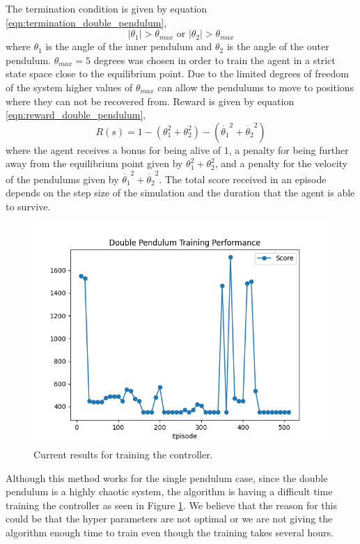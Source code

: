 \documentclass{LTHtwocol} %
\begin{document}
The termination condition is given by equation \eqref{eqn:termination_double_pendulum},
\begin{equation}
	|\theta_1| > \theta_{max} \text{ or } |\theta_2| > \theta_{max}
	\label{eqn:termination_double_pendulum}
\end{equation}
where $\theta_1$ is the angle of the inner pendulum and $\theta_2$ is the angle of the outer pendulum.
$\theta_{max} = 5$ degrees was chosen in order to train the agent in a strict state space close to the equilibrium point.
Due to the limited degrees of freedom of the system higher values of $\theta_{max}$ can allow the pendulums to move to positions where they can not be recovered from.
Reward is given by equation \eqref{eqn:reward_double_pendulum},
\begin{equation}
	R(s) = 1 - \left( \theta_1^2 + \theta_2^2 \right) - \left(\dot{\theta_1}^2 + \dot{\theta_2}^2 \right)
	\label{eqn:reward_double_pendulum}
\end{equation}
where the agent receives a bonus for being alive of $1$, a penalty for being further away from the equilibrium point given by $\theta_1^2 + \theta_2^2$, and a penalty for the velocity of the pendulums given by $\dot{\theta_1}^2 + \dot{\theta_2}^2$.
The total score received in an episode depends on the step size of the simulation and the duration that the agent is able to survive.

\begin{figure}[H]
	\centering
	\includegraphics[width=0.9\columnwidth]{figures/double_pendulum_eval.png}
	\caption{Current results for training the controller.}
	\label{fig:double_pendulum_score}
\end{figure}
Although this method works for the single pendulum case, since the double pendulum is a highly chaotic system, the algorithm is having a difficult time training the controller as seen in Figure \ref{fig:double_pendulum_score}.
We believe that the reason for this could be that the hyper parameters are not optimal or we are not giving the algorithm enough time to train even though the training takes several hours.
\end{document}
